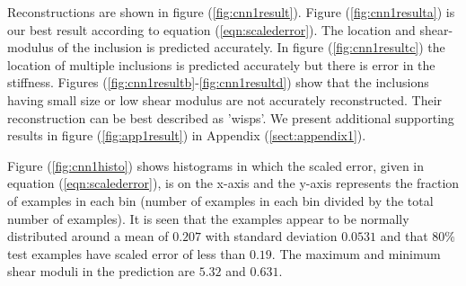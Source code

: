 \documentclass[10pt]{article}
\begin{document}
Reconstructions are shown in figure (\ref{fig:cnn1result}). Figure (\ref{fig:cnn1resulta}) is our best result according to equation (\ref{eqn:scalederror}). The location and shear-modulus of the inclusion is predicted accurately. In figure (\ref{fig:cnn1resultc}) the location of multiple inclusions is predicted accurately but there is error in the stiffness. Figures (\ref{fig:cnn1resultb}-\ref{fig:cnn1resultd}) show that the inclusions having small size or low shear modulus are not accurately reconstructed. Their reconstruction can be best described as 'wisps'. We present additional supporting results in figure (\ref{fig:app1result}) in Appendix (\ref{sect:appendix1}).

Figure (\ref{fig:cnn1histo}) shows histograms in which the scaled error, given in equation (\ref{eqn:scalederror}), is on the x-axis and the y-axis represents the fraction of examples in each bin (number of examples in each bin divided by the total number of examples). It is seen that the examples appear to be normally distributed around a mean of ${0.207}$ with standard deviation $0.0531$ and that $80\%$ test examples have scaled error of less than $0.19$. The maximum and minimum shear moduli in the prediction are $5.32$ and $0.631$. 
\end{document}
